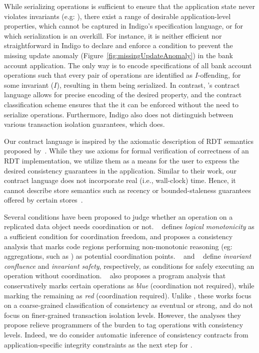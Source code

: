 While serializing operations is sufficient to ensure that the application state
never violates invariants (e.g: ), there exist a range of
desirable application-level properties, which cannot be captured in Indigo's
specification language, or for which serialization is an overkill. For instance,
it is neither efficient nor straightforward in Indigo to declare and enforce a
condition to prevent the missing update anomaly
(Figure~\ref{fig:missingUpdateAnomaly}) in the bank account application. The
only way is to encode specifications of all bank account operations such that
every pair of operations are identified as $I$-offending, for some invariant
($I$), resulting in them being serialized. In contrast, \name's contract
language allows for precise encoding of the desired property, and the contract
classification scheme ensures that the it can be enforced without the need to
serialize operations. Furthermore, Indigo also does not distinguish between
various transaction isolation guarantees, which \name does.

Our contract language is inspired by the axiomatic description of RDT semantics
proposed by~\cite{Burckhardt2014}. While they use axioms for formal
verification of correctness of an RDT implementation, we utilize them as a
means for the user to express the desired consistency guarantees in the
application. Similar to their work, our contract language does not incorporate
real (i.e., wall-clock) time. Hence, it cannot describe store semantics such as
recency or bounded-staleness guarantees offered by certain
stores~\cite{Pileus}.

Several conditions have been proposed to judge whether an operation on
a replicated data object needs coordination or not. ~\cite{Calm}
defines \emph{logical monotonicity} as a sufficient condition for
coordination freedom, and proposes a consistency analysis that marks
code regions performing non-monotonic reasoning (eg: aggregations,
such as ) as potential coordination points.
~\cite{IConfluence} and ~\cite{Sieve} define \emph{invariant
confluence} and \emph{invariant safety}, respectively, as conditions
for safely executing an operation without coordination. ~\cite{Sieve}
also proposes a program analysis that conservatively marks certain
operations as \emph{blue} (coordination not required), while marking
the remaining as \emph{red} (coordination required). Unlike \name,
these works focus on a coarse-grained classification of consistency as
eventual or strong, and do not focus on finer-grained transaction
isolation levels. However, the analyses they propose relieve
programmers of the burden to tag operations with consistency levels.
Indeed, we do consider automatic inference of consistency contracts
from application-specific integrity constraints as the next step for
\name.
